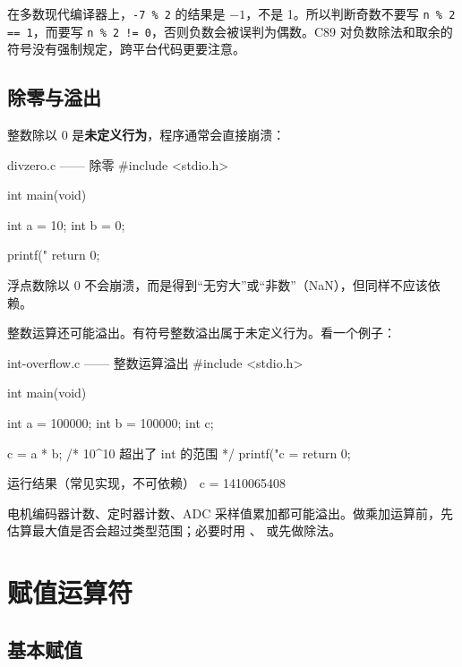\begin{pitfall}[负数取余要小心]
在多数现代编译器上，\texttt{-7 \% 2} 的结果是 $-1$，不是 1。所以判断奇数不要写 \texttt{n \% 2 == 1}，而要写 \texttt{n \% 2 != 0}，否则负数会被误判为偶数。C89 对负数除法和取余的符号没有强制规定，跨平台代码更要注意。
\end{pitfall}

\subsection{除零与溢出}

整数除以 0 是\textbf{未定义行为}，程序通常会直接崩溃：

\begin{codebox}{divzero.c —— 除零}
#include <stdio.h>

int main(void)
{
    int a = 10;
    int b = 0;

    printf("%
    return 0;
}
\end{codebox}

浮点数除以 0 不会崩溃，而是得到“无穷大”或“非数”（NaN），但同样不应该依赖。

整数运算还可能溢出。有符号整数溢出属于未定义行为。看一个例子：

\begin{codebox}{int-overflow.c —— 整数运算溢出}
#include <stdio.h>

int main(void)
{
    int a = 100000;
    int b = 100000;
    int c;

    c = a * b;       /* 10^10 超出了 int 的范围 */
    printf("c = %
    return 0;
}
\end{codebox}

\begin{outbox}{运行结果（常见实现，不可依赖）}
c = 1410065408
\end{outbox}

\begin{tipbox}[电控中的溢出]
电机编码器计数、定时器计数、ADC 采样值累加都可能溢出。做乘加运算前，先估算最大值是否会超过类型范围；必要时用 、 或先做除法。
\end{tipbox}

\section{赋值运算符}

\subsection{基本赋值}

